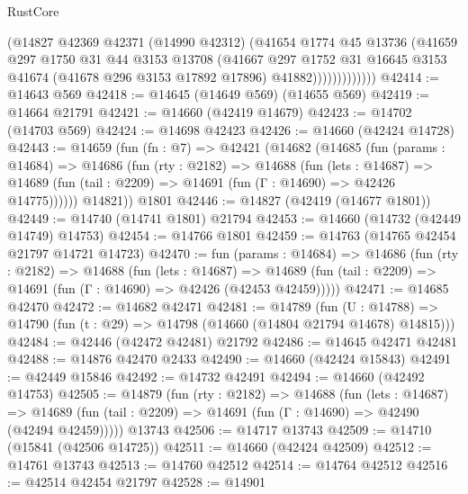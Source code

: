 \begin{lexlean}{RustCore}
\begin{coremodule}
                      (@14827
                        @42369
                        @42371
                        (@14990 @42312)
                        (@41654
                          @1774
                          @45
                          @13736
                          (@41659
                            @297
                            @1750
                            @31
                            @44
                            @3153
                            @13708
                            (@41667
                              @297
                              @1752
                              @31
                              @16645
                              @3153
                              @41674
                              (@41678 @296 @3153 @17892 @17896)
                              @41882)))))))))))))
@42414 := @14643 @569
@42418 := @14645 (@14649 @569) (@14655 @569)
@42419 := @14664 @21791
@42421 := @14660 (@42419 @14679)
@42423 := @14702 (@14703 @569)
@42424 := @14698 @42423
@42426 := @14660 (@42424 @14728)
@42443 := @14659
    (fun (fn : @7) =>
    @42421
      (@14682
        (@14685
          (fun (params : @14684) =>
          @14686
            (fun (rty : @2182) =>
            @14688
              (fun (lets : @14687) =>
              @14689 (fun (tail : @2209) => @14691 (fun (Γ : @14690) => @42426 @14775))))))
        @14821))
    @1801
@42446 := @14827 (@42419 (@14677 @1801))
@42449 := @14740 (@14741 @1801) @21794
@42453 := @14660 (@14732 (@42449 @14749) @14753)
@42454 := @14766 @1801
@42459 := @14763 (@14765 @42454 @21797 @14721 @14723)
@42470 := fun (params : @14684) =>
  @14686
    (fun (rty : @2182) =>
    @14688
      (fun (lets : @14687) =>
      @14689 (fun (tail : @2209) => @14691 (fun (Γ : @14690) => @42426 (@42453 @42459)))))
@42471 := @14685 @42470
@42472 := @14682 @42471
@42481 := @14789
    (fun (U : @14788) => @14790 (fun (t : @29) => @14798 (@14660 (@14804 @21794 @14678) @14815)))
@42484 := @42446 (@42472 @42481) @21792
@42486 := @14645 @42471 @42481
@42488 := @14876 @42470 @2433
@42490 := @14660 (@42424 @15843)
@42491 := @42449 @15846
@42492 := @14732 @42491
@42494 := @14660 (@42492 @14753)
@42505 := @14879
    (fun (rty : @2182) =>
    @14688
      (fun (lets : @14687) =>
      @14689 (fun (tail : @2209) => @14691 (fun (Γ : @14690) => @42490 (@42494 @42459)))))
    @13743
@42506 := @14717 @13743
@42509 := @14710 (@15841 (@42506 @14725))
@42511 := @14660 (@42424 @42509)
@42512 := @14761 @13743
@42513 := @14760 @42512
@42514 := @14764 @42512
@42516 := @42514 @42454 @21797
@42528 := @14901

\end{coremodule}
\end{lexlean}
